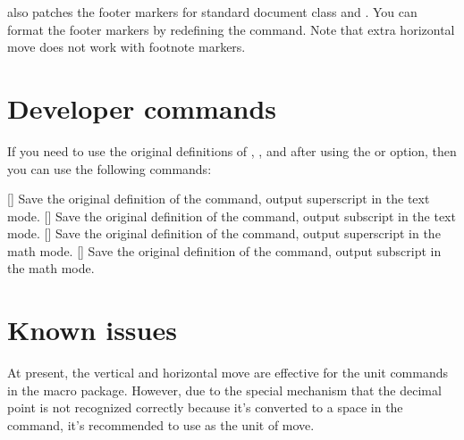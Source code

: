 \documentclass[load-preamble+]{cnltx-doc}
\begin{document}
 also patches the footer markers for standard document class and . You can format the footer markers by redefining the  command. Note that extra horizontal move does not work with footnote markers.

\section{Developer commands}
If you need to use the original definitions of , ,  and  after using the  or  option, then you can use the following commands:
\begin{commands}
  []
  Save the original definition of the  command, output superscript in the text mode.
  []
  Save the original definition of the  command, output subscript in the text mode.
  []
  Save the original definition of the  command, output superscript in the math mode.
  []
  Save the original definition of the  command, output subscript in the math mode.
\end{commands}

\section{Known issues}
At present, the vertical and horizontal move are effective for the unit commands in the  macro package. However, due to the special mechanism that the decimal point is not recognized correctly because it's converted to a space in the  command, it's recommended to use  as the unit of move.

\nocite{*}
\end{document}
